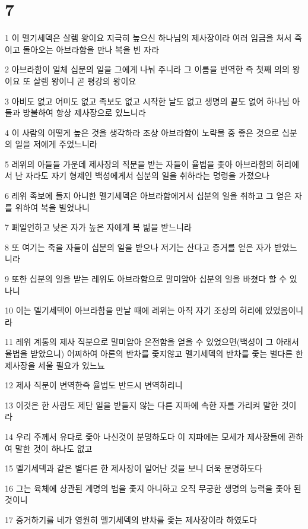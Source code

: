 \chapter{7}

\par 1 이 멜기세덱은 살렘 왕이요 지극히 높으신 하나님의 제사장이라 여러 임금을 쳐서 죽이고 돌아오는 아브라함을 만나 복을 빈 자라
\par 2 아브라함이 일체 십분의 일을 그에게 나눠 주니라 그 이름을 번역한 즉 첫째 의의 왕이요 또 살렘 왕이니 곧 평강의 왕이요
\par 3 아비도 없고 어미도 없고 족보도 없고 시작한 날도 없고 생명의 끝도 없어 하나님 아들과 방불하여 항상 제사장으로 있느니라
\par 4 이 사람의 어떻게 높은 것을 생각하라 조상 아브라함이 노략물 중 좋은 것으로 십분의 일을 저에게 주었느니라
\par 5 레위의 아들들 가운데 제사장의 직분을 받는 자들이 율법을 좇아 아브라함의 허리에서 난 자라도 자기 형제인 백성에게서 십분의 일을 취하라는 명령을 가졌으나
\par 6 레위 족보에 들지 아니한 멜기세덱은 아브라함에게서 십분의 일을 취하고 그 얻은 자를 위하여 복을 빌었나니
\par 7 폐일언하고 낮은 자가 높은 자에게 복 빎을 받느니라
\par 8 또 여기는 죽을 자들이 십분의 일을 받으나 저기는 산다고 증거를 얻은 자가 받았느니라
\par 9 또한 십분의 일을 받는 레위도 아브라함으로 말미암아 십분의 일을 바쳤다 할 수 있나니
\par 10 이는 멜기세덱이 아브라함을 만날 때에 레위는 아직 자기 조상의 허리에 있었음이니라
\par 11 레위 계통의 제사 직분으로 말미암아 온전함을 얻을 수 있었으면(백성이 그 아래서 율법을 받았으니) 어찌하여 아론의 반차를 좇지않고 멜기세덱의 반차를 좇는 별다른 한 제사장을 세울 필요가 있느뇨
\par 12 제사 직분이 변역한즉 율법도 반드시 변역하리니
\par 13 이것은 한 사람도 제단 일을 받들지 않는 다른 지파에 속한 자를 가리켜 말한 것이라
\par 14 우리 주께서 유다로 좇아 나신것이 분명하도다 이 지파에는 모세가 제사장들에 관하여 말한 것이 하나도 없고
\par 15 멜기세덱과 같은 별다른 한 제사장이 일어난 것을 보니 더욱 분명하도다
\par 16 그는 육체에 상관된 계명의 법을 좇지 아니하고 오직 무궁한 생명의 능력을 좇아 된 것이니
\par 17 증거하기를 네가 영원히 멜기세덱의 반차를 좇는 제사장이라 하였도다
